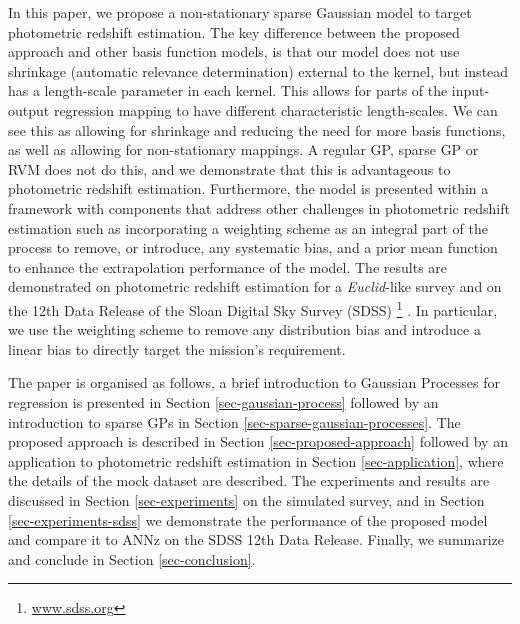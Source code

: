 \documentclass[useAMS,usenatbib,fleqn]{mn2e}
\begin{document}
In this paper, we propose a non-stationary sparse Gaussian model to target photometric redshift estimation. The key difference between the proposed approach and other basis function models, is that our model does not use shrinkage (automatic relevance determination) external to the kernel, but instead has a length-scale parameter in each kernel. This allows for parts of the input-output regression mapping to have different characteristic length-scales. We can see this as allowing for shrinkage and reducing the need for more basis functions, as well as allowing for non-stationary mappings. A regular GP, sparse GP or RVM does not do this, and we demonstrate that this is advantageous to photometric redshift estimation. Furthermore, the model is presented within a framework with components that address other challenges in photometric redshift estimation such as incorporating a weighting scheme as an integral part of the process to remove, or introduce, any systematic bias, and a prior mean function to enhance the extrapolation performance of the model. The results are demonstrated on photometric redshift estimation for a {\em Euclid}-like survey \citep{laureijs2011} and on the 12th Data Release of the Sloan Digital Sky Survey (SDSS) \citep{SDSS3}\footnote{\url{www.sdss.org}} . In particular, we use the weighting scheme to remove any distribution bias and introduce a linear bias to directly target the mission's requirement. 

The paper is organised as follows, a brief introduction to Gaussian Processes for regression is presented in Section \ref{sec-gaussian-process} followed by an introduction to sparse GPs in Section \ref{sec-sparse-gaussian-processes}. The proposed approach is described in Section \ref{sec-proposed-approach} followed by an application to photometric redshift estimation in Section \ref{sec-application}, where the details of the mock dataset are described. The experiments and results are discussed in Section \ref{sec-experiments} on the simulated survey, and in Section \ref{sec-experiments-sdss} we demonstrate the performance of the proposed model and compare it to ANNz on the SDSS 12th Data Release. Finally, we summarize and conclude in Section \ref{sec-conclusion}.
\end{document}
